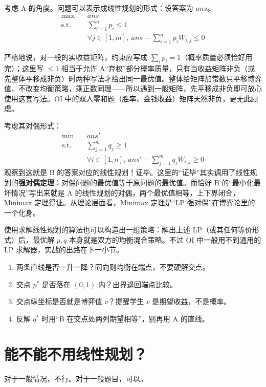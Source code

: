 \documentclass[UTF8,a4paper,11pt,oneside,openany,fontset=fandol]{ctexbook}
\theoremstyle{definition}
\begin{document}
考虑 A 的角度。问题可以表示成线性规划的形式：设答案为 $ans$。
\[
 \begin{aligned}
 \max\quad & ans\\
 \text{s.t.}\quad & \sum_{i=1}^{n}p_i\le1\\
 & \forall j\in[1,m],\ ans-\sum_{i=1}^{n}p_iW_{i,j}\le0
 \end{aligned}
\]

\begin{pitfall}[$\sum p_i\le1$ 还是 $\sum p_i=1$]
严格地说，对一般的实收益矩阵，约束应写成 $\sum_i p_i=1$（概率质量必须恰好用完）；这里写 $\le1$ 相当于允许 A“弃权”部分概率质量，只有当收益矩阵非负（或先整体平移成非负）时两种写法才给出同一最优值。整体给矩阵加常数只平移博弈值、不改变均衡策略，乘正数同理——所以遇到一般矩阵，先平移成非负即可放心使用这套写法。OI 中的双人零和题（胜率、金钱收益）矩阵天然非负，更无此顾虑。
\end{pitfall}

考虑其对偶形式：
\[
 \begin{aligned}
 \min\quad & ans'\\
 \text{s.t.}\quad & \sum_{j=1}^{m}q_j\ge1\\
 & \forall i\in[1,n],\ ans'-\sum_{j=1}^{m}q_jW_{i,j}\ge0
 \end{aligned}
\]
观察到这就是 B 的答案对应的线性规划！证毕。这里的“证毕”其实调用了线性规划的\textbf{强对偶定理}：对偶问题的最优值等于原问题的最优值。而恰好 B 的“最小化最坏情况”写出来就是 A 的线性规划的对偶，两个最优值相等，上下界闭合，Minimax 定理得证。从理论层面看，Minimax 定理是“LP 强对偶”在博弈论里的一个化身。

使用求解线性规划的算法也可以构造出一组策略：解出上述 LP（或其任何等价形式）后，最优解 $p,q$ 本身就是双方的均衡混合策略。不过 OI 中一般用不到通用的 LP 求解器，实战的出路在下一小节。

\begin{teach}[图解法的画图检查表]
\begin{enumerate}
\item 两条直线是否一升一降？同向则均衡在端点，不要硬解交点。
\item 交点 $p^*$ 是否落在 $(0,1)$ 内？出界退回端点比较。
\item 交点纵坐标是否就是博弈值 $v$？提醒学生 $v$ 是期望收益，不是概率。
\item 反解 $q^*$ 时用“B 在交点处两列期望相等”，别再用 A 的直线。
\end{enumerate}
\end{teach}
\section{能不能不用线性规划？}
对于一般情况，不行。对于一般题目，可以。
\end{document}

